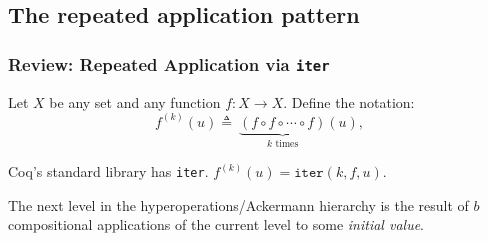 \subsection{The repeated application pattern}

\begin{frame}
\frametitle{Review: Repeated Application via \texttt{iter}}

Let $X$ be any set and any function $f: X\to X$. Define the notation:
\begin{equation*}
f^{(k)}(u) \triangleq ~ \underbrace{(f\circ f\circ \cdots \circ f)}_{\text{$k$ times}}(u),
\end{equation*}

\bigskip

Coq's standard library has \texttt{iter}. \quad $f^{(k)}(u) = \texttt{iter}(k, f, u).$

\bigskip

The next level in the hyperoperations/Ackermann hierarchy is the result of $b$ compositional applications of the current level to some \emph{initial value}.


%
%

\end{frame}


